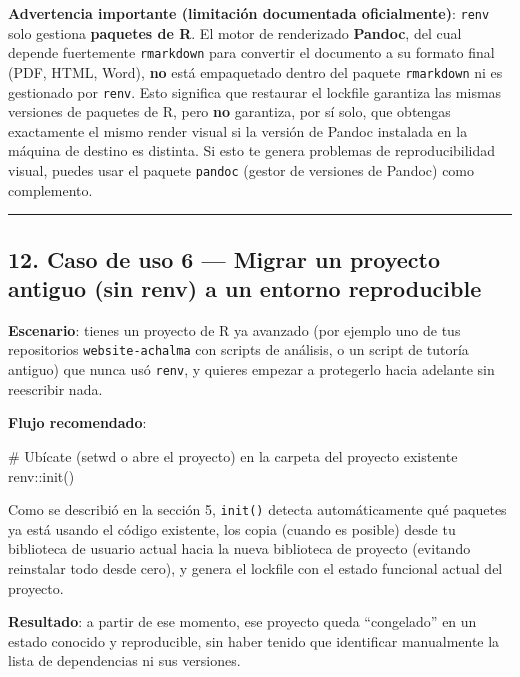 \documentclass[
  man,
  floatsintext,
  longtable,
  a4paper,
  nolmodern,
  notxfonts,
  notimes,
  12pt,
  colorlinks=true,linkcolor=blue,citecolor=blue,urlcolor=blue]{apa7}
\newenvironment{Shaded}{\begin{snugshade}}{\end{snugshade}}
\newcommand{\CommentTok}[1]{\textcolor[rgb]{0.37,0.37,0.37}{#1}}
\newcommand{\FunctionTok}[1]{\textcolor[rgb]{0.28,0.35,0.67}{#1}}
\newcommand{\NormalTok}[1]{\textcolor[rgb]{0.00,0.23,0.31}{#1}}
\newcommand{\SpecialCharTok}[1]{\textcolor[rgb]{0.37,0.37,0.37}{#1}}
\begin{document}
\textbf{Advertencia importante (limitación documentada oficialmente)}:
\texttt{renv} solo gestiona \textbf{paquetes de R}. El motor de
renderizado \textbf{Pandoc}, del cual depende fuertemente
\texttt{rmarkdown} para convertir el documento a su formato final (PDF,
HTML, Word), \textbf{no} está empaquetado dentro del paquete
\texttt{rmarkdown} ni es gestionado por \texttt{renv}. Esto significa
que restaurar el lockfile garantiza las mismas versiones de paquetes de
R, pero \textbf{no} garantiza, por sí solo, que obtengas exactamente el
mismo render visual si la versión de Pandoc instalada en la máquina de
destino es distinta. Si esto te genera problemas de reproducibilidad
visual, puedes usar el paquete \texttt{pandoc} (gestor de versiones de
Pandoc) como complemento.

\begin{center}\rule{0.5\linewidth}{0.5pt}\end{center}

\subsection{12. Caso de uso 6 --- Migrar un proyecto antiguo (sin renv)
a un entorno
reproducible}\label{caso-de-uso-6-migrar-un-proyecto-antiguo-sin-renv-a-un-entorno-reproducible}

\textbf{Escenario}: tienes un proyecto de R ya avanzado (por ejemplo uno
de tus repositorios \texttt{website-achalma} con scripts de análisis, o
un script de tutoría antiguo) que nunca usó \texttt{renv}, y quieres
empezar a protegerlo hacia adelante sin reescribir nada.

\textbf{Flujo recomendado}:

\begin{Shaded}
\begin{Highlighting}[]
\CommentTok{\# Ubícate (setwd o abre el proyecto) en la carpeta del proyecto existente}
\NormalTok{renv}\SpecialCharTok{::}\FunctionTok{init}\NormalTok{()}
\end{Highlighting}
\end{Shaded}

Como se describió en la sección 5, \texttt{init()} detecta
automáticamente qué paquetes ya está usando el código existente, los
copia (cuando es posible) desde tu biblioteca de usuario actual hacia la
nueva biblioteca de proyecto (evitando reinstalar todo desde cero), y
genera el lockfile con el estado funcional actual del proyecto.

\textbf{Resultado}: a partir de ese momento, ese proyecto queda
``congelado'' en un estado conocido y reproducible, sin haber tenido que
identificar manualmente la lista de dependencias ni sus versiones.
\end{document}
